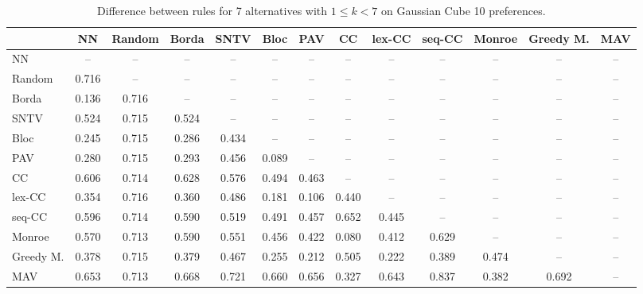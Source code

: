 
\begin{table*}[h!]
\centering
\begin{tabular}{lcccccccccccc}
\toprule
 & NN & Random & Borda & SNTV & Bloc & PAV & CC & lex-CC & seq-CC & Monroe & Greedy M. & MAV \\
\midrule
NN & -- & -- & -- & -- & -- & -- & -- & -- & -- & -- & -- & -- \\
Random & 0.716 & -- & -- & -- & -- & -- & -- & -- & -- & -- & -- & -- \\
Borda & 0.136 & 0.716 & -- & -- & -- & -- & -- & -- & -- & -- & -- & -- \\
SNTV & 0.524 & 0.715 & 0.524 & -- & -- & -- & -- & -- & -- & -- & -- & -- \\
Bloc & 0.245 & 0.715 & 0.286 & 0.434 & -- & -- & -- & -- & -- & -- & -- & -- \\
PAV & 0.280 & 0.715 & 0.293 & 0.456 & 0.089 & -- & -- & -- & -- & -- & -- & -- \\
CC & 0.606 & 0.714 & 0.628 & 0.576 & 0.494 & 0.463 & -- & -- & -- & -- & -- & -- \\
lex-CC & 0.354 & 0.716 & 0.360 & 0.486 & 0.181 & 0.106 & 0.440 & -- & -- & -- & -- & -- \\
seq-CC & 0.596 & 0.714 & 0.590 & 0.519 & 0.491 & 0.457 & 0.652 & 0.445 & -- & -- & -- & -- \\
Monroe & 0.570 & 0.713 & 0.590 & 0.551 & 0.456 & 0.422 & 0.080 & 0.412 & 0.629 & -- & -- & -- \\
Greedy M. & 0.378 & 0.715 & 0.379 & 0.467 & 0.255 & 0.212 & 0.505 & 0.222 & 0.389 & 0.474 & -- & -- \\
MAV & 0.653 & 0.713 & 0.668 & 0.721 & 0.660 & 0.656 & 0.327 & 0.643 & 0.837 & 0.382 & 0.692 & -- \\
\bottomrule
\end{tabular}

\caption{Difference between rules for 7 alternatives with $1 \leq k < 7$ on Gaussian Cube 10 preferences.}
\end{table*}

